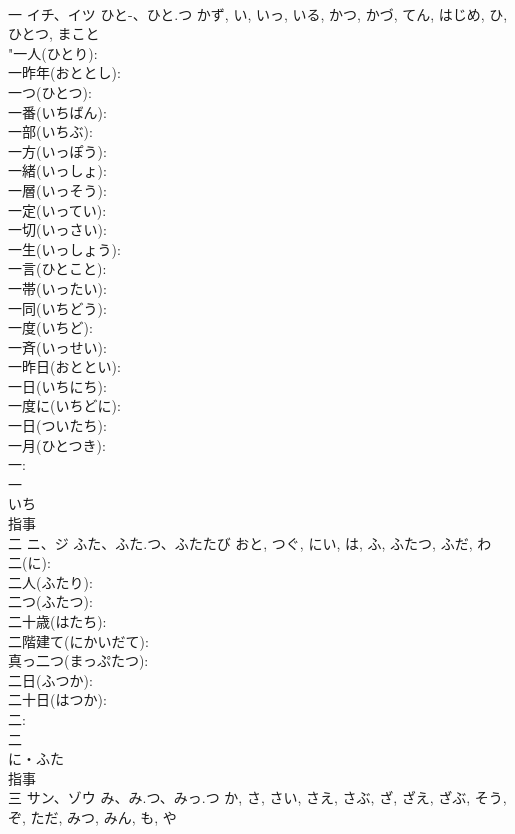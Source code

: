 \documentclass[8pt]{extreport}
\begin{document}
\begin{CJK}{UTF8}{min}
\\	一	イチ、イツ	ひと-、ひと.つ	かず, い, いっ, いる, かつ, かづ, てん, はじめ, ひ, ひとつ, まこと	
\\	"一人(ひとり): 
\\	一昨年(おととし): 
\\	一つ(ひとつ): 
\\	一番(いちばん): 
\\	一部(いちぶ): 
\\	一方(いっぽう): 
\\	一緒(いっしょ): 
\\	一層(いっそう): 
\\	一定(いってい): 
\\	一切(いっさい): 
\\	一生(いっしょう): 
\\	一言(ひとこと): 
\\	一帯(いったい): 
\\	一同(いちどう): 
\\	一度(いちど): 
\\	一斉(いっせい): 
\\	一昨日(おととい): 
\\	一日(いちにち): 
\\	一度に(いちどに): 
\\	一日(ついたち): 
\\	一月(ひとつき): 
\\	一: 
\\	一	
\\	いち	
\\	指事 
\\	二	ニ、ジ	ふた、ふた.つ、ふたたび	おと, つぐ, にい, は, ふ, ふたつ, ふだ, わ	
\\	二(に): 
\\	二人(ふたり): 
\\	二つ(ふたつ): 
\\	二十歳(はたち): 
\\	二階建て(にかいだて): 
\\	真っ二つ(まっぷたつ): 
\\	二日(ふつか): 
\\	二十日(はつか): 
\\	二: 
\\	二	
\\	に・ふた	
\\	指事 
\\	三	サン、ゾウ	み、み.つ、みっ.つ	か, さ, さい, さえ, さぶ, ざ, ざえ, ざぶ, そう, ぞ, ただ, みつ, みん, も, や	

\end{CJK}
\end{document}
